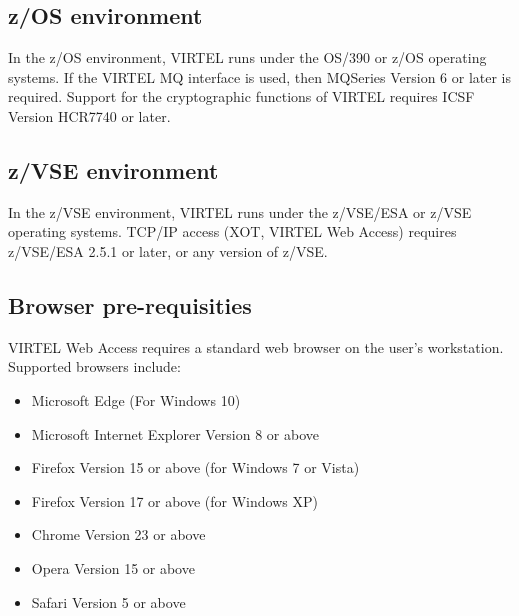 \documentclass[letterpaper,10pt,english]{sphinxmanual}
\begin{document}
\subsection{z/OS environment}
\label{\detokenize{Installation_Guide:z-os-environment}}
In the z/OS environment, VIRTEL runs under the OS/390 or z/OS operating systems. If the VIRTEL MQ interface is used, then MQSeries Version 6 or later is required. Support for the cryptographic functions of VIRTEL requires ICSF Version HCR7740 or later.


\subsection{z/VSE environment}
\label{\detokenize{Installation_Guide:z-vse-environment}}
In the z/VSE environment, VIRTEL runs under the z/VSE/ESA or z/VSE operating systems. TCP/IP access (XOT, VIRTEL Web Access) requires z/VSE/ESA 2.5.1 or later, or any version of z/VSE.

\ignorespaces 

\subsection{Browser pre-requisities}
\label{\detokenize{Installation_Guide:browser-pre-requisities}}\label{\detokenize{Installation_Guide:index-1}}
VIRTEL Web Access requires a standard web browser on the user’s workstation. Supported browsers include:
\begin{itemize}
\item {} 
Microsoft Edge (For Windows 10)

\item {} 
Microsoft Internet Explorer Version 8 or above

\item {} 
Firefox Version 15 or above (for Windows 7 or Vista)

\item {} 
Firefox Version 17 or above (for Windows XP)

\item {} 
Chrome Version 23 or above

\item {} 
Opera Version 15 or above

\item {} 
Safari Version 5 or above

\end{itemize}
\end{document}
